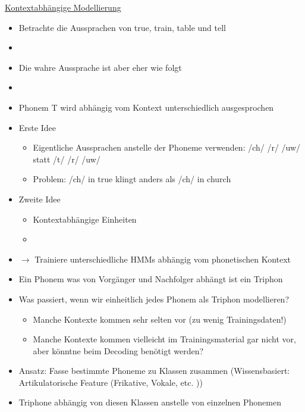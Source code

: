 \documentclass[a4paper,10pt,oneside]{article}
\begin{document}
\underline{Kontextabhängige Modellierung} \\
	\begin{itemize}
		\item Betrachte die Aussprachen von true, train, table und tell
		\item[] %
		\item Die wahre Aussprache ist aber eher wie folgt
		\item[] %
		\item Phonem T wird abhängig vom Kontext unterschiedlich ausgesprochen
		\item Erste Idee
			\begin{itemize}
				\item Eigentliche Aussprachen anstelle der Phoneme verwenden: /ch/ /r/ /uw/ statt /t/ /r/ /uw/
				\item Problem: /ch/ in true klingt anders als /ch/ in church
			\end{itemize}
		\item Zweite Idee
			\begin{itemize}
				\item Kontextabhängige Einheiten
				\item[] %
			\end{itemize}
		\item[] $\rightarrow$ Trainiere unterschiedliche HMMs abhängig vom phonetischen Kontext
		\item Ein Phonem was von Vorgänger und Nachfolger abhängt ist ein Triphon
		\item Was passiert, wenn wir einheitlich jedes Phonem als Triphon modellieren? 
			\begin{itemize}
				\item Manche Kontexte kommen sehr selten vor (zu wenig Trainingsdaten!)
				\item Manche Kontexte kommen vielleicht im Trainingsmaterial gar nicht vor, aber könntne beim Decoding benötigt werden?
			\end{itemize}
		\item Ansatz: Fasse bestimmte Phoneme zu Klassen zusammen (Wissensbasiert: Artikulatorische Feature (Frikative, Vokale, etc. ))
		\item Triphone abhängig von diesen Klassen anstelle von einzelnen Phonemen
	\end{itemize}
\end{document}
